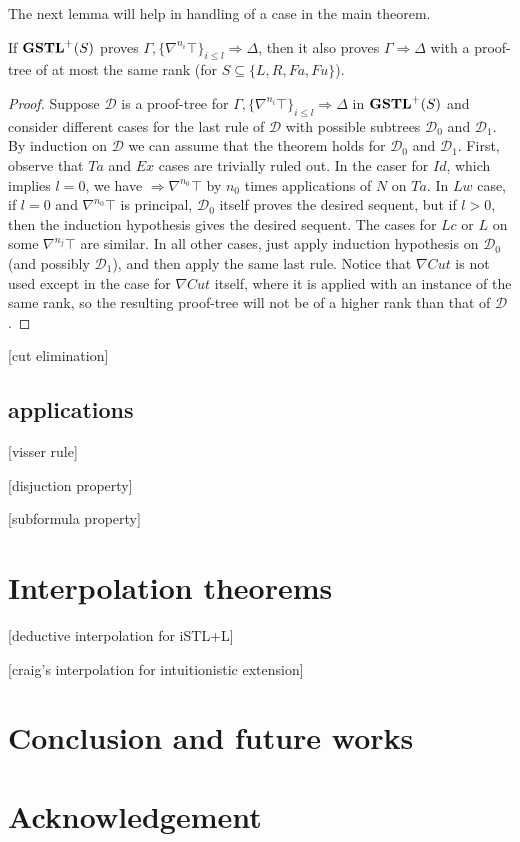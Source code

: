\documentclass[12pt,a4paper]{article}
\begin{document}
The next lemma will help in handling of a case in the main theorem.

\begin{lem}\label{lem:gstl-top-redundant} If $\mathbf{GSTL}^+(S)$ proves $\Gamma , \{\nabla^{n_i} \top\}_{i \leq l} \Rightarrow \Delta$, then it also proves $\Gamma \Rightarrow \Delta$ with a proof-tree of at most the same rank (for $S \subseteq \{L, R, Fa, Fu\}$).
\end{lem}
\begin{proof}
Suppose $\mathcal{D}$ is a proof-tree for $\Gamma , \{\nabla^{n_i} \top\}_{i \leq l} \Rightarrow \Delta$ in $\mathbf{GSTL}^+(S)$ and consider different cases for the last rule of $\mathcal{D}$ with possible subtrees $\mathcal{D}_0$ and $\mathcal{D}_1$.
By induction on $\mathcal{D}$ we can assume that the theorem holds for $\mathcal{D}_0$ and $\mathcal{D}_1$.
First, observe that $Ta$ and $Ex$ cases are trivially ruled out. In the caser for $Id$, which implies $l = 0$, we have $\Rightarrow \nabla^{n_0} \top$ by $n_0$ times applications of $N$ on $Ta$. In $Lw$ case, if $l = 0$ and $\nabla^{n_0} \top$ is principal, $\mathcal{D}_0$ itself proves the desired sequent, but if $l > 0$, then the induction hypothesis gives the desired sequent. The cases for $Lc$ or $L$ on some $\nabla^{n_j} \top$  are similar. In all other cases, just apply induction hypothesis on $\mathcal{D}_0$ (and possibly $\mathcal{D}_1$), and then apply the same last rule. Notice that $\nabla Cut$ is not used except in the case for $\nabla Cut$ itself, where it is applied with an instance of the same rank, so the resulting proof-tree will not be of a higher rank than that of $\mathcal{D}$.
\end{proof}


[cut elimination]

\subsection{applications}
[visser rule]

[disjuction property]

[subformula property]

\section{Interpolation theorems}
[deductive interpolation for iSTL+L]

[craig's interpolation for intuitionistic extension]

\section{Conclusion and future works}

\section{Acknowledgement}



\end{document}
